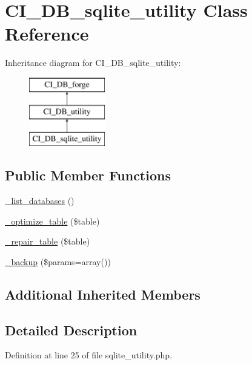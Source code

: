 \hypertarget{class_c_i___d_b__sqlite__utility}{\section{C\-I\-\_\-\-D\-B\-\_\-sqlite\-\_\-utility Class Reference}
\label{class_c_i___d_b__sqlite__utility}
}
Inheritance diagram for C\-I\-\_\-\-D\-B\-\_\-sqlite\-\_\-utility\-:\begin{figure}[H]
\begin{center}
\leavevmode
\includegraphics[height=3.000000cm]{class_c_i___d_b__sqlite__utility}
\end{center}
\end{figure}
\subsection*{Public Member Functions}
\begin{DoxyCompactItemize}
\item 
\hyperlink{class_c_i___d_b__sqlite__utility_aa047e69a7e732ca7280270f87f82bb3a}{\-\_\-list\-\_\-databases} ()
\item 
\hyperlink{class_c_i___d_b__sqlite__utility_a4856292816fbbc8e9d927f565766727b}{\-\_\-optimize\-\_\-table} (\$table)
\item 
\hyperlink{class_c_i___d_b__sqlite__utility_a7f40d4a3d78917e455e315cf708842ef}{\-\_\-repair\-\_\-table} (\$table)
\item 
\hyperlink{class_c_i___d_b__sqlite__utility_a30f3053d2c82e7562349924363507afa}{\-\_\-backup} (\$params=array())
\end{DoxyCompactItemize}
\subsection*{Additional Inherited Members}


\subsection{Detailed Description}


Definition at line 25 of file sqlite\-\_\-utility.\-php.




